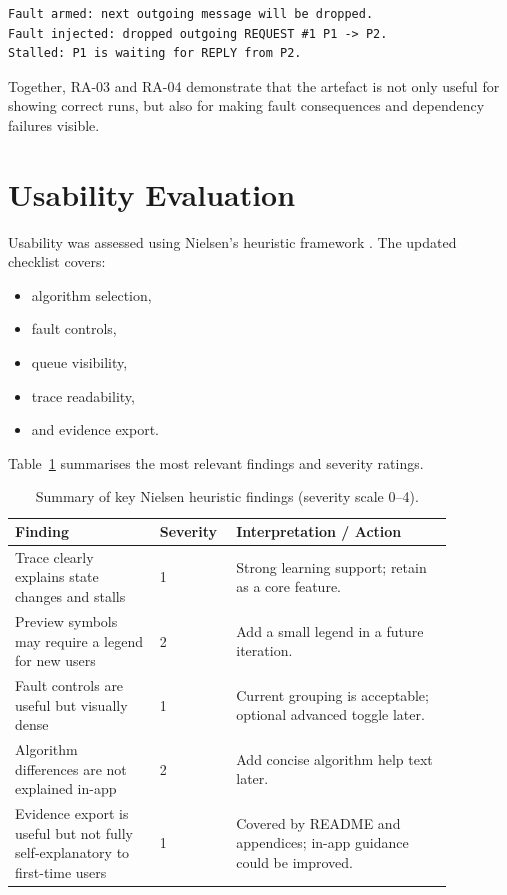 \begin{verbatim}
Fault armed: next outgoing message will be dropped.
Fault injected: dropped outgoing REQUEST #1 P1 -> P2.
Stalled: P1 is waiting for REPLY from P2.
\end{verbatim}

Together, RA-03 and RA-04 demonstrate that the artefact is not only useful for showing correct runs, but also for making fault consequences and dependency failures visible.

\section{Usability Evaluation}
Usability was assessed using Nielsen’s heuristic framework \cite{nielsen1994usability}. The updated checklist covers:
\begin{itemize}
  \item algorithm selection,
  \item fault controls,
  \item queue visibility,
  \item trace readability,
  \item and evidence export.
\end{itemize}

Table~\ref{tab:nielsen-summary} summarises the most relevant findings and severity ratings.

\begin{table}[htbp]
\centering
\small
\renewcommand{\arraystretch}{1.15}
\begin{tabular}{p{0.30\linewidth} p{0.12\linewidth} p{0.45\linewidth}}
\toprule
\textbf{Finding} & \textbf{Severity} & \textbf{Interpretation / Action} \\
\midrule
Trace clearly explains state changes and stalls & 1 & Strong learning support; retain as a core feature. \\
Preview symbols may require a legend for new users & 2 & Add a small legend in a future iteration. \\
Fault controls are useful but visually dense & 1 & Current grouping is acceptable; optional advanced toggle later. \\
Algorithm differences are not explained in-app & 2 & Add concise algorithm help text later. \\
Evidence export is useful but not fully self-explanatory to first-time users & 1 & Covered by README and appendices; in-app guidance could be improved. \\
\bottomrule
\end{tabular}
\caption{Summary of key Nielsen heuristic findings (severity scale 0--4).}
\label{tab:nielsen-summary}
\end{table}

